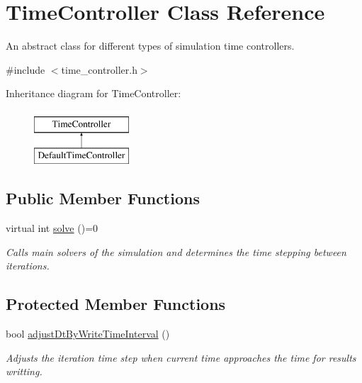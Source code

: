 \hypertarget{classTimeController}{\section{Time\-Controller Class Reference}
\label{classTimeController}
}


An abstract class for different types of simulation time controllers.  




{\ttfamily \#include $<$time\-\_\-controller.\-h$>$}

Inheritance diagram for Time\-Controller\-:\begin{figure}[H]
\begin{center}
\leavevmode
\includegraphics[height=2.000000cm]{classTimeController}
\end{center}
\end{figure}
\subsection*{Public Member Functions}
\begin{DoxyCompactItemize}
\item 
virtual int \hyperlink{classTimeController_abcb9dcb68b50cac5c176595091d913d1}{solve} ()=0
\begin{DoxyCompactList}\small\item\em Calls main solvers of the simulation and determines the time stepping between iterations. \end{DoxyCompactList}\end{DoxyCompactItemize}
\subsection*{Protected Member Functions}
\begin{DoxyCompactItemize}
\item 
bool \hyperlink{classTimeController_aeb2d0926950dc0ca0ec6d11420272d90}{adjust\-Dt\-By\-Write\-Time\-Interval} ()
\begin{DoxyCompactList}\small\item\em Adjusts the iteration time step when current time approaches the time for results writting. \end{DoxyCompactList}\end{DoxyCompactItemize}
